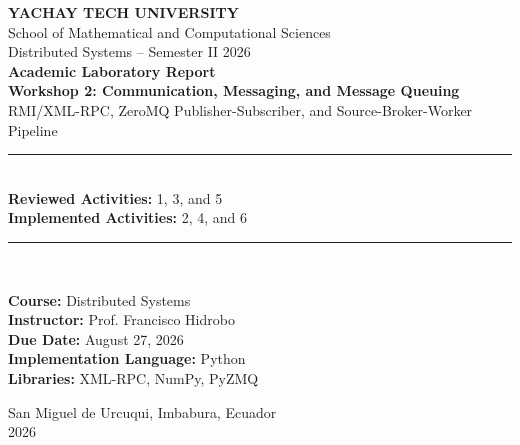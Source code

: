 \documentclass[11pt,a4paper]{article}
\begin{document}
\hypersetup{pageanchor=false}

\begin{titlepage}
    \thispagestyle{empty}
    \centering
    \vspace*{1.0cm}

    {\Huge \textbf{YACHAY TECH UNIVERSITY}}\\[0.35cm]
    {\Large School of Mathematical and Computational Sciences}\\[0.25cm]
    {\large Distributed Systems -- Semester II 2026}\\[1.5cm]

    {\LARGE \textbf{Academic Laboratory Report}}\\[0.30cm]
    {\LARGE \textbf{Workshop 2: Communication, Messaging, and Message Queuing}}\\[0.55cm]
    {\large RMI/XML-RPC, ZeroMQ Publisher-Subscriber, and Source-Broker-Worker Pipeline}\\[1.25cm]

    \rule{0.78\textwidth}{0.6pt}\\[0.45cm]
    {\normalsize \textbf{Reviewed Activities:} 1, 3, and 5}\\[0.18cm]
    {\normalsize \textbf{Implemented Activities:} 2, 4, and 6}\\[0.45cm]
    \rule{0.78\textwidth}{0.6pt}\\[1.25cm]

    \begin{minipage}{0.82\textwidth}
        \centering
        \textbf{Course:} Distributed Systems\\
        \textbf{Instructor:} Prof. Francisco Hidrobo\\
        \textbf{Due Date:} August 27, 2026\\
        \textbf{Implementation Language:} Python\\
        \textbf{Libraries:} XML-RPC, NumPy, PyZMQ
    \end{minipage}

    \vfill
    {\small San Miguel de Urcuqui, Imbabura, Ecuador\\2026}
\end{titlepage}

\hypersetup{pageanchor=true}

\begin{abstract}
This report presents the work completed for Workshop 2 in Distributed Systems.
The workshop contains six activities: three activities dedicated to reviewing and
testing the professor's baseline examples, and three activities requiring new
Python implementations. Activity 1 reviews the XML-RPC client-server example.
Activity 2 implements a distributed Matrix Manager with NumPy-based computation.
Activity 3 reviews the ZeroMQ Publisher-Subscriber example. Activity 4 extends
that model to multiple publishers and multiple subscribers. Activity 5 reviews
the direct Source-to-Worker pipeline. Activity 6 implements a brokered pipeline
with one broker input and one broker output. The implementation was validated
with local execution evidence, generated screenshots, and an automated test
suite covering Activities 2, 4, and 6.
\end{abstract}
\end{document}
